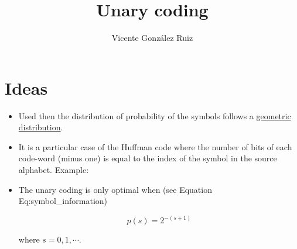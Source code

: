 \title{Unary coding}
\author{Vicente González Ruiz}
\maketitle
\tableofcontents

\section{Ideas}
\begin{itemize}
\item
  Used then the distribution of probability of the symbols follows a
  \href{https://en.wikipedia.org/wiki/Geometric_distribution}{geometric
  distribution}.
\item
  It is a particular case of the Huffman code where the number of bits
  of each code-word (minus one) is equal to the index of the symbol in
  the source alphabet. Example:
\end{itemize}


\begin{itemize}
\item
  The unary coding is only optimal when (see Equation
  Eq:symbol\_information)

  \begin{equation}
    p(s) = 2^{-(s+1)} \tag{Eq:Unary}
  \end{equation}

  where \(s=0,1,\cdots\).
\end{itemize}


